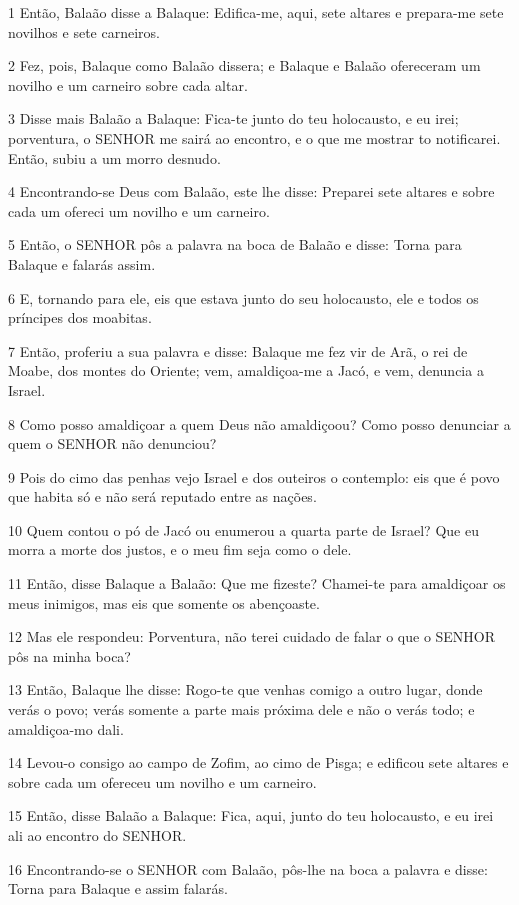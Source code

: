 \par 1 Então, Balaão disse a Balaque: Edifica-me, aqui, sete altares e prepara-me sete novilhos e sete carneiros.
\par 2 Fez, pois, Balaque como Balaão dissera; e Balaque e Balaão ofereceram um novilho e um carneiro sobre cada altar.
\par 3 Disse mais Balaão a Balaque: Fica-te junto do teu holocausto, e eu irei; porventura, o SENHOR me sairá ao encontro, e o que me mostrar to notificarei. Então, subiu a um morro desnudo.
\par 4 Encontrando-se Deus com Balaão, este lhe disse: Preparei sete altares e sobre cada um ofereci um novilho e um carneiro.
\par 5 Então, o SENHOR pôs a palavra na boca de Balaão e disse: Torna para Balaque e falarás assim.
\par 6 E, tornando para ele, eis que estava junto do seu holocausto, ele e todos os príncipes dos moabitas.
\par 7 Então, proferiu a sua palavra e disse: Balaque me fez vir de Arã, o rei de Moabe, dos montes do Oriente; vem, amaldiçoa-me a Jacó, e vem, denuncia a Israel.
\par 8 Como posso amaldiçoar a quem Deus não amaldiçoou? Como posso denunciar a quem o SENHOR não denunciou?
\par 9 Pois do cimo das penhas vejo Israel e dos outeiros o contemplo: eis que é povo que habita só e não será reputado entre as nações.
\par 10 Quem contou o pó de Jacó ou enumerou a quarta parte de Israel? Que eu morra a morte dos justos, e o meu fim seja como o dele.
\par 11 Então, disse Balaque a Balaão: Que me fizeste? Chamei-te para amaldiçoar os meus inimigos, mas eis que somente os abençoaste.
\par 12 Mas ele respondeu: Porventura, não terei cuidado de falar o que o SENHOR pôs na minha boca?
\par 13 Então, Balaque lhe disse: Rogo-te que venhas comigo a outro lugar, donde verás o povo; verás somente a parte mais próxima dele e não o verás todo; e amaldiçoa-mo dali.
\par 14 Levou-o consigo ao campo de Zofim, ao cimo de Pisga; e edificou sete altares e sobre cada um ofereceu um novilho e um carneiro.
\par 15 Então, disse Balaão a Balaque: Fica, aqui, junto do teu holocausto, e eu irei ali ao encontro do SENHOR.
\par 16 Encontrando-se o SENHOR com Balaão, pôs-lhe na boca a palavra e disse: Torna para Balaque e assim falarás.
